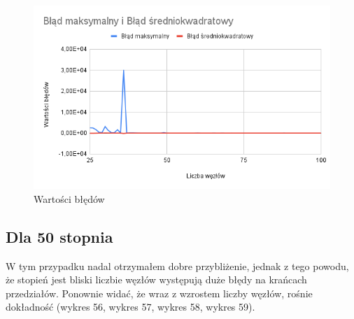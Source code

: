 \documentclass{article}
\begin{document}
\begin{figure}[H]
  \centering
  \begin{minipage}[b]{0.4\textwidth}
    \includegraphics[width=\textwidth]{img55.png}
    \caption{Wartości błędów}
  \end{minipage}
\end{figure}

\newpage

\subsection{Dla 50 stopnia}

W tym przypadku nadal otrzymałem dobre przybliżenie, jednak z tego powodu, że stopień jest bliski liczbie węzłów występują duże błędy na krańcach przedziałów. Ponownie widać, że wraz z wzrostem liczby węzłów, rośnie dokładność (wykres 56, wykres 57, wykres 58, wykres 59).
\end{document}
